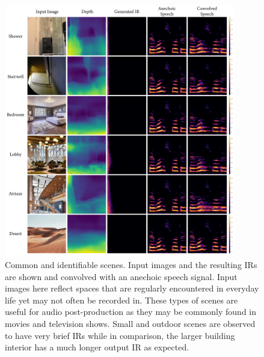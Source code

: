 \begin{figure}
    \centering
    \includegraphics[width=0.9\textwidth]{p_everyday.png}
    \caption{Common and identifiable scenes. Input images and the resulting IRs are shown and convolved with an anechoic speech signal. Input images here reflect spaces that are regularly encountered in everyday life yet may not often be recorded in. These types of scenes are useful for audio post-production as they may be commonly found in movies and television shows. Small and outdoor scenes are observed to have very brief IRs while in comparison, the larger building interior has a much longer output IR as expected.}
    \label{fig:p_everyday}
\end{figure}


